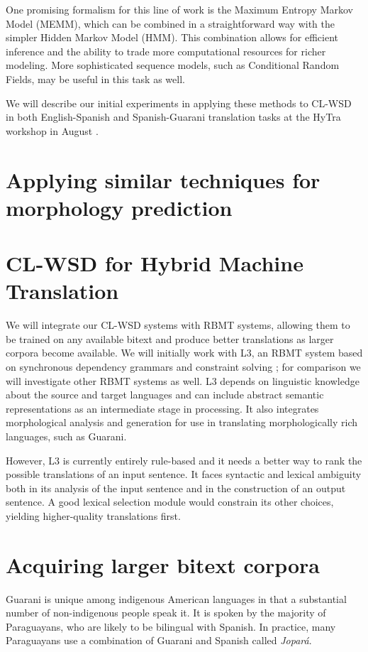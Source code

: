 \documentclass{article}
\begin{document}
One promising formalism for this line of work is the Maximum
Entropy Markov Model (MEMM), which can be combined in a straightforward way
with the simpler Hidden Markov Model (HMM). This combination allows for
efficient inference and the ability to trade more computational resources for
richer modeling. More sophisticated sequence models, such as Conditional Random
Fields, may be useful in this task as well.

We will describe our initial experiments in applying these methods to CL-WSD in
both English-Spanish and Spanish-Guarani translation tasks at the HyTra
workshop in August \cite{rudnick-gasser:2013:HyTra-2013}.

\section{Applying similar techniques for morphology prediction}

\section{CL-WSD for Hybrid Machine Translation}
We will integrate our CL-WSD systems with RBMT systems, allowing them
to be trained on any available bitext and produce better translations as larger
corpora become available.
We will initially work with L3, an RBMT system based on synchronous dependency
grammars and constraint solving \cite{gasser:sxdg,gasser:aflat2012};
for comparison we will investigate other RBMT systems as well. L3
depends on linguistic knowledge about the source and target languages and can
include abstract semantic representations as an intermediate stage in
processing. It also integrates morphological analysis and generation for
use in translating morphologically rich languages, such as Guarani.

However, L3 is currently entirely rule-based and it needs a better way to rank
the possible translations of an input sentence. It faces syntactic and lexical
ambiguity both in its analysis of the input sentence and in the construction of
an output sentence.  A good lexical selection module would constrain its other
choices, yielding higher-quality translations first.

\section{Acquiring larger bitext corpora}
Guarani is unique among indigenous American languages in that a substantial
number of non-indigenous people speak it. It is spoken by the majority of
Paraguayans, who are likely to be bilingual with Spanish. In practice, many
Paraguayans use a combination of Guarani and Spanish called \emph{Jopar{\'a}}.
\end{document}
